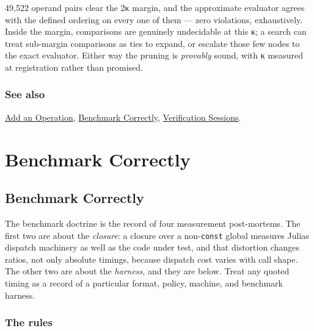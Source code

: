 49,522 operand pairs clear the 2κ margin, and the approximate evaluator agrees with the defined ordering on every one of them — zero violations, exhaustively. Inside the margin, comparisons are genuinely undecidable at this κ; a search can treat sub-margin comparisons as ties to expand, or escalate those few nodes to the exact evaluator. Either way the pruning is \emph{provably} sound, with κ measured at registration rather than promised.



\subsection{See also}



\label{292862844209942199-dup23}{}


\href{internals\_\allowbreak{}add\_\allowbreak{}operation.md}{Add an Operation}, \href{internals\_\allowbreak{}benchmark.md}{Benchmark Correctly}, \href{examples\_\allowbreak{}verification.md}{Verification Sessions}.



\chapter{Benchmark Correctly}


\section{Benchmark Correctly}



\label{1754891814411159897}{}


The benchmark doctrine is the record of four measurement post-mortems. The first two are about the \emph{closure}: a closure over a non-\texttt{const} global measures Julia{\textquotesingle}s dispatch machinery as well as the code under test, and that distortion changes ratios, not only absolute timings, because dispatch cost varies with call shape. The other two are about the \emph{harness}, and they are below. Treat any quoted timing as a record of a particular format, policy, machine, and benchmark harness.



\subsection{The rules}



